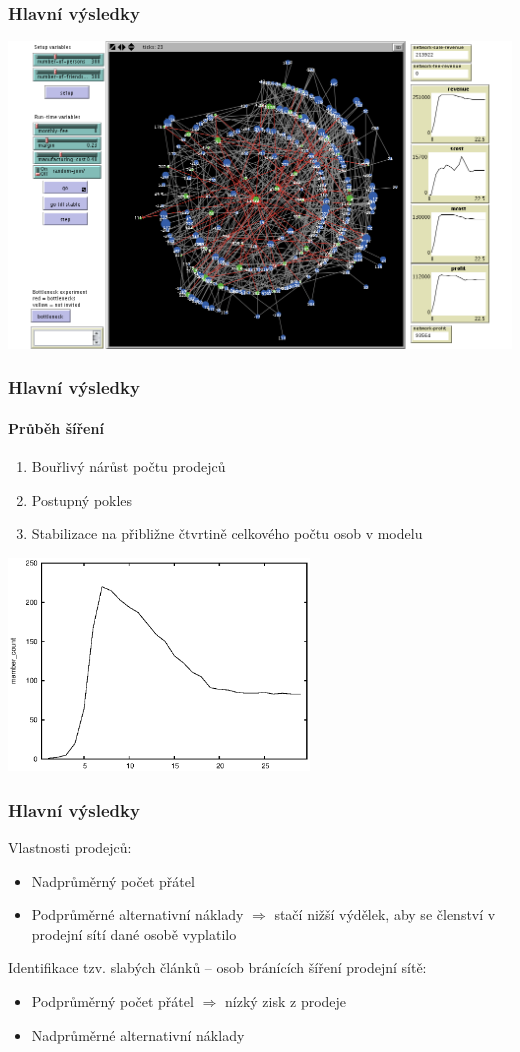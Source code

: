 \documentclass[xcolor=dvipsnames]{beamer}
\begin{document}
  \begin{frame}
    \frametitle{Hlavní výsledky}
    \hspace{-0.8cm}
    \includegraphics[width=1.0\paperwidth]{screen1.png}
  \end{frame}
  \begin{frame}
    \frametitle{Hlavní výsledky}
    \framesubtitle{Průběh šíření}
    \begin{enumerate}
      \item Bouřlivý nárůst počtu prodejců
      \item Postupný pokles
      \item Stabilizace na přibližne čtvrtině celkového počtu osob v modelu
    \end{enumerate}
    \begin{center}\includegraphics[width=0.6\textwidth]{member_count.eps}\end{center}
  \end{frame}
  \begin{frame}
    \frametitle{Hlavní výsledky}
    Vlastnosti prodejců:
    \begin{itemize}
      \item Nadprůměrný počet přátel
      \item Podprůměrné alternativní náklady $\Rightarrow$ stačí nižší výdělek, aby se členství v prodejní sítí dané osobě vyplatilo
    \end{itemize}
    Identifikace tzv. slabých článků -- osob bránících šíření prodejní sítě:
    \begin{itemize}
      \item Podprůměrný počet přátel $\Rightarrow$ nízký zisk z prodeje 
      \item Nadprůměrné alternativní náklady
    \end{itemize}
  \end{frame}
\end{document}
